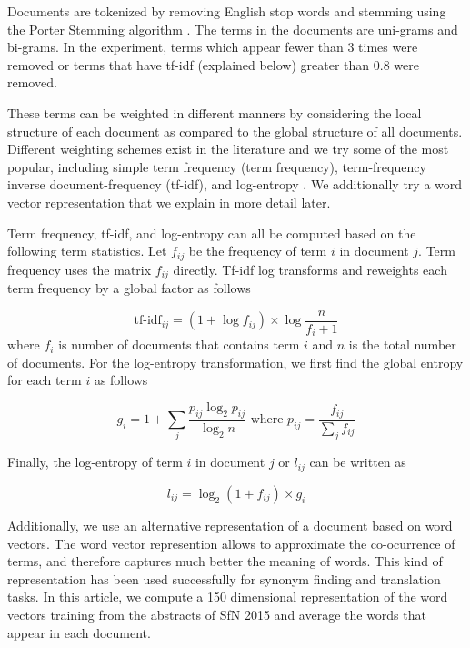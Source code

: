 \documentclass[a4paper]{article}
\begin{document}
Documents are tokenized by removing English stop words and stemming using
the Porter Stemming algorithm \cite{porter1980algorithm}. The terms in the
documents are uni-grams and bi-grams. In the experiment, terms which appear fewer than 3 times were removed or terms that have tf-idf (explained below) greater than 0.8 were removed.

These terms can be weighted in different
manners by considering the local structure of each document as compared
to the global structure of all documents. Different weighting schemes
exist in the literature and we try some of the most popular, including
simple term frequency (term frequency),
term-frequency inverse document-frequency (tf-idf), and
log-entropy \cite{lee2005empirical, pincombe2004comparison}.
We additionally try a word vector representation that we explain
in more detail later.

Term frequency, tf-idf, and log-entropy can all be computed based on the
following term statistics. Let $f_{ij}$ be the frequency of term $i$
in document $j$. Term frequency uses the matrix $f_{ij}$ directly.
Tf-idf log transforms and reweights each term frequency by a global factor as follows

\begin{equation}
\mbox{tf-idf}_{ij} = (1 + \log f_{ij}) \times \log \frac{n}{f_i + 1}
\label{eq:tfidf}
\end{equation}
where $f_i$ is number of documents that contains term $i$ and $n$ is the total number of documents. For the log-entropy transformation, we first find the global entropy for each term $i$ as follows

\begin{equation}
g_i = 1 + \sum_j \frac{p_{ij} \log_2 p_{ij}}{\log_2 n} \mbox{ where } p_{ij} = \frac{f_{ij}}{\sum_j f_{ij}}
\label{eq:globalweight}
\end{equation}

Finally, the log-entropy of term $i$ in document $j$ or $l_{ij}$ can be written as

\begin{equation}
l_{ij} = \log_2(1 + f_{ij}) \times g_i
\label{eq:localweight}
\end{equation}

Additionally,
we use an alternative representation of a document based on word
vectors. The word vector represention \cite{mikolov2013distributed} allows
to approximate the co-ocurrence of terms, and therefore captures much better the meaning of words.
This kind of representation has been used successfully for synonym finding and translation tasks. In this article, we compute a 150 dimensional representation
of the word vectors training from the abstracts of SfN 2015 and average the words that appear in each document.
\end{document}
